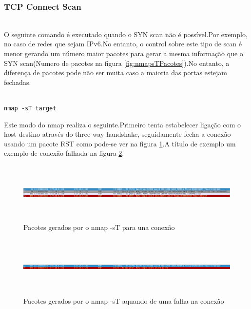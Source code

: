 \subsubsection{TCP Connect Scan}
\hfill\\

O seguinte comando é executado quando o SYN scan não é possível.Por exemplo, no caso de redes que sejam IPv6.No entanto, o control sobre este tipo de scan é menor gerando um número maior pacotes para gerar a mesma informação que o SYN scan(Numero de pacotes na figura \ref{fig:nmapsTPacotes}).No entanto, a diferença de pacotes pode não ser muita caso a maioria das portas estejam fechadas.

\begin{lstlisting}

nmap -sT target

\end{lstlisting}

Este modo do nmap realiza o seguinte.Primeiro tenta estabelecer ligação com o host destino através do three-way handshake, seguidamente fecha a conexão usando um pacote RST como pode-se ver na figura \ref{fig:nmapsTConexao}.A título de exemplo um exemplo de conexão falhada na figura \ref{fig:nmapsTNConexao}.

\begin{figure}[h!]
	\centering
		
	\includegraphics[width=\textwidth,height=3cm,keepaspectratio]{images/nmapsTConexao.png}
		
	\caption{Pacotes gerados por o nmap -sT para una conexão}
		
	\label{fig:nmapsTConexao}
\end{figure}

\begin{figure}[h!]
	\centering
		
	\includegraphics[width=\textwidth,height=3cm,keepaspectratio]{images/nmapsTNConexao.png}
		
	\caption{Pacotes gerados por o nmap -sT aquando de uma falha na conexão}
		
	\label{fig:nmapsTNConexao}
\end{figure}


